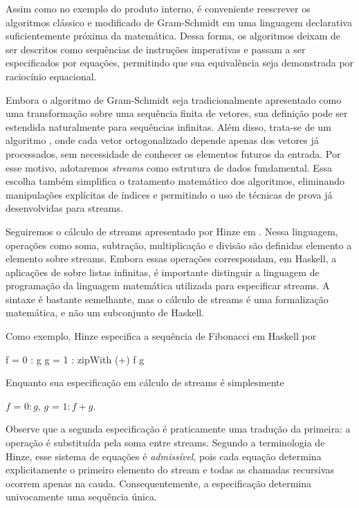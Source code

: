
Assim como no exemplo do produto interno, é conveniente reescrever os algoritmos clássico e modificado de Gram-Schmidt em uma linguagem declarativa suficientemente próxima da matemática. Dessa forma, os algoritmos deixam de ser descritos como sequências de instruções imperativas e passam a ser especificados por equações, permitindo que sua equivalência seja demonstrada por raciocínio equacional.

Embora o algoritmo de Gram-Schmidt seja tradicionalmente apresentado como uma transformação sobre uma sequência finita de vetores, sua definição pode ser estendida naturalmente para sequências infinitas. Além disso, trata-se de um algoritmo , onde cada vetor ortogonalizado depende apenas dos vetores já processados, sem necessidade de conhecer os elementos futuros da entrada. Por esse motivo, adotaremos \emph{streams} como estrutura de dados fundamental. Essa escolha também simplifica o tratamento matemático dos algoritmos, eliminando manipulações explícitas de índices e permitindo o uso de técnicas de prova já desenvolvidas para streams.

Seguiremos o cálculo de streams apresentado por Hinze em \cite{Hinze2010}. Nessa linguagem, operações como soma, subtração, multiplicação e divisão são definidas elemento a elemento sobre streams. Embora essas operações correspondam, em Haskell, a aplicações de  sobre listas infinitas, é importante distinguir a linguagem de programação da linguagem matemática utilizada para especificar streams. A sintaxe é bastante semelhante, mas o cálculo de streams é uma formalização matemática, e não um subconjunto de Haskell.

Como exemplo, Hinze especifica a sequência de Fibonacci em Haskell por

\begin{code}
f = 0 : g
g = 1 : zipWith (+) f g
\end{code}

Enquanto sua especificação em cálculo de streams é simplesmente

\begin{code}
$f$ = $0 : g$,
$g$ = $1 : f + g$.
\end{code}

Observe que a segunda especificação é praticamente uma tradução da primeira: a operação  é substituída pela soma entre streams. Segundo a terminologia de Hinze, esse sistema de equações é \emph{admissível}, pois cada equação determina explicitamente o primeiro elemento do stream e todas as chamadas recursivas ocorrem apenas na cauda. Consequentemente, a especificação determina univocamente uma sequência única.

